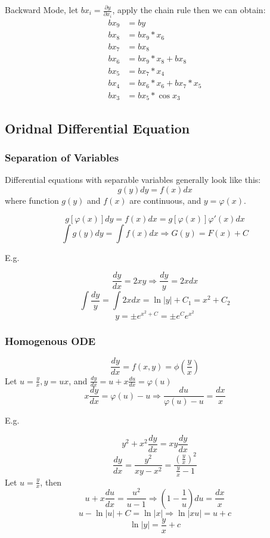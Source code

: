 Backward Mode, let $bx_i = \frac{\partial y}{\partial x_i}$, apply
the chain rule then we can obtain:
\begin{align*}
	bx_9 &= by \\
	bx_8 &= bx_9 * x_6 \\
	bx_7 &= bx_8 \\
	bx_6 &= bx_9 * x_8 + bx_8 \\
	bx_5 &= bx_7 * x_4 \\
	bx_4 &= bx_6 * x_6 + bx_7 * x_5 \\
	bx_3 &= bx_5 * \cos x_3
\end{align*}

\subsection{Oridnal Differential Equation}

\subsubsection{Separation of Variables}

Differential equations with separable variables generally look like this:
$$ g(y)dy = f(x)dx $$
where function $g(y)$ and $f(x)$ are continuous, and $y=\varphi(x)$.

$$ g[\varphi(x)] dy = f(x)dx = g[\varphi(x)]\varphi'(x)dx $$
$$ \int g(y)dy = \int f(x)dx \Rightarrow G(y) = F(x) + C $$

E.g.

$$ \frac{dy}{dx} = 2xy \Rightarrow \frac{dy}{y} = 2xdx $$
$$ \int \frac{dy}{y} = \int 2xdx = \ln|y| + C_1 = x^2 + C_2 $$
$$ y = \pm e^{x^2+C} = \pm e^C e^{x^2} $$

\subsubsection{Homogenous ODE}

$$ \frac{dy}{dx} = f(x,y) = \phi(\frac{y}{x}) $$
Let $u=\frac{y}{x}, y=ux$, and $\frac{dy}{dx} = u + x\frac{du}{dx} = \varphi(u) $
$$ x\frac{dy}{dx} = \varphi(u) - u \Rightarrow \frac{du}{\varphi(u) -u} = \frac{dx}{x} $$

E.g.

$$ y^2 + x^2 \frac{dy}{dx} = xy\frac{dy}{dx} $$
$$ \frac{dy}{dx} = \frac{y^2}{xy - x^2} =
 \frac{(\frac{y}{x})^2}{\frac{y}{x} - 1} $$
 Let $u=\frac{y}{x}$, then
 $$ u+x\frac{du}{dx}=\frac{u^2}{u-1} \Rightarrow
 (1-\frac{1}{u})du = \frac{dx}{x} $$
 $$ u - \ln|u| + C = \ln|x| \Rightarrow \ln|xu| = u+c $$
 $$ \ln|y| = \frac{y}{x} + c $$

